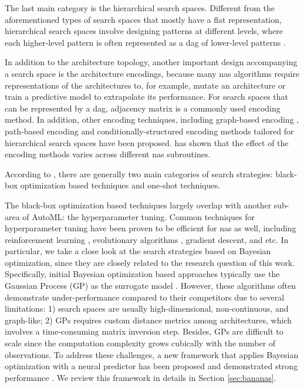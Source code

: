 \documentclass[a4paper,oneside,bibliography=totoc]{scrbook}
\begin{document}
\begin{description}[leftmargin=0cm, listparindent=\parindent]
		The last main category is the hierarchical search spaces. Different from the aforementioned types of search spaces that mostly have a flat representation, hierarchical search spaces involve designing patterns at different levels, where each higher-level pattern is often represented as a \gls{dag} of lower-level patterns \cite{christoforidis2021novel, liu2018hierarchical}.
		
	In addition to the architecture topology, another important design accompanying a search space is the architecture encodings, because  many \gls{nas} algorithms require representations of the architectures to, for example, mutate an architecture or train a predictive model to extrapolate its performance. For search spaces that can be represented by a \gls{dag}, adjacency matrix is a commonly used encoding method. In addition, other encoding techniques, including graph-based encoding \cite{ning2020generic}, path-based encoding \cite{white2019bananas} and conditionally-structured encoding methods tailored for hierarchical search spaces have been proposed. \cite{white2020study} has shown that the effect of the encoding methods varies across different \gls{nas} subroutines.	
	  
	\item [Search Strategy] According to \cite{white2023survey}, there are generally two main categories of search strategies: black-box optimization based techniques and one-shot techniques. 
	 
		The black-box optimization based techniques largely overlap with another sub-area of AutoML: the hyperparameter tuning. Common techniques for hyperparameter tuning have been proven to be efficient for \gls{nas} as well, including reinforcement learning \cite{zoph2017neural, zoph2018learning}, evolutionary algorithms \cite{maziarz2018evo-nas,  real2019regularized}, gradient descent\cite{liu2018darts}, and etc. In particular, we take a close look at the search strategies based on Bayesian optimization, since they are closely related to the research question of this work. Specifically, initial Bayesian optimization based approaches typically use the Gaussian Process (GP) as the surrogate model \cite{kandasamy2018neural}. However, these algorithms often demonstrate under-performance compared to their competitors due to several limitations: 1) search spaces are usually high-dimensional, non-continuous, and graph-like; 2) GPs requires custom distance metrics among architectures, which involves a time-consuming matrix inversion step. Besides, GPs are difficult to scale since the computation complexity grows cubically with the number of observations. To address these challenges, a new framework that applies Bayesian optimization with a neural predictor has been proposed and demonstrated strong performance \cite{ma2019deep, springenberg2016bayesian, white2019bananas}. We review this framework in details in Section \ref{sec:bananas}.
		

\end{description}
\end{document}
